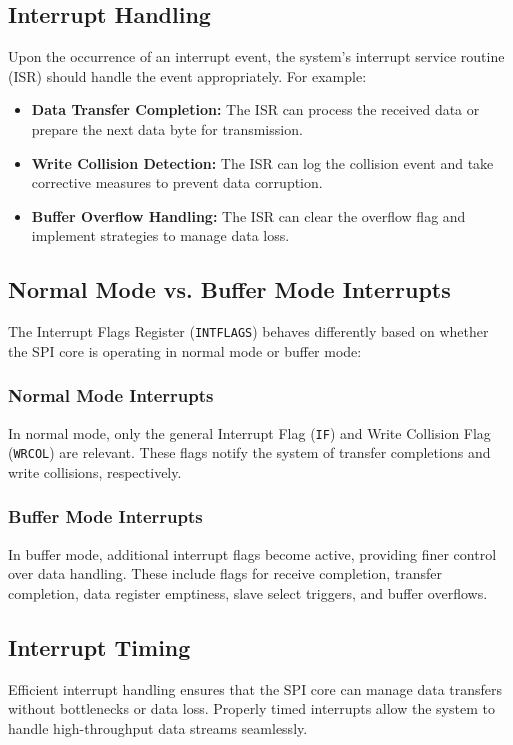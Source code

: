 \documentclass{article}
\begin{document}
\subsection{Interrupt Handling}
Upon the occurrence of an interrupt event, the system's interrupt service routine (ISR) should handle the event appropriately. For example:
\begin{itemize}
    \item \textbf{Data Transfer Completion:} The ISR can process the received data or prepare the next data byte for transmission.
    \item \textbf{Write Collision Detection:} The ISR can log the collision event and take corrective measures to prevent data corruption.
    \item \textbf{Buffer Overflow Handling:} The ISR can clear the overflow flag and implement strategies to manage data loss.
\end{itemize}

\subsection{Normal Mode vs. Buffer Mode Interrupts}
The Interrupt Flags Register (\texttt{INTFLAGS}) behaves differently based on whether the SPI core is operating in normal mode or buffer mode:

\subsubsection{Normal Mode Interrupts}
In normal mode, only the general Interrupt Flag (\texttt{IF}) and Write Collision Flag (\texttt{WRCOL}) are relevant. These flags notify the system of transfer completions and write collisions, respectively.

\subsubsection{Buffer Mode Interrupts}
In buffer mode, additional interrupt flags become active, providing finer control over data handling. These include flags for receive completion, transfer completion, data register emptiness, slave select triggers, and buffer overflows.

\subsection{Interrupt Timing}
Efficient interrupt handling ensures that the SPI core can manage data transfers without bottlenecks or data loss. Properly timed interrupts allow the system to handle high-throughput data streams seamlessly.
\end{document}

